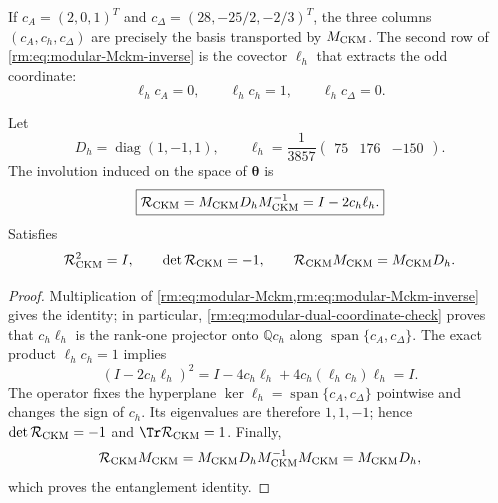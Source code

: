 If \(c_A=(2,0,1)^T\) and
\(c_\Delta=(28,-25/2,-2/3)^T\), the three columns
\((c_A,c_h,c_\Delta)\) are precisely the basis transported by
\(M_{\rm CKM}\). The second row of
\cref{rm:eq:modular-Mckm-inverse} is the covector \(\ell_h\) that extracts the
odd coordinate:
\begin{equation}
\label{rm:eq:modular-dual-coordinate-check}
\ell_hc_A=0,
\qquad
\ell_hc_h=1,
\qquad
\ell_hc_\Delta=0.
\end{equation}

\begin{theorem}
\label{rm:thm:modular-ckm-reflection}
Let
\begin{equation}
\label{rm:eq:modular-Dh-lh}
D_h=\operatorname{diag}(1,-1,1),
\qquad
\ell_h=\frac1{3857}\begin{pmatrix}75&176&-150\end{pmatrix}.
\end{equation}
The involution induced on the space of \(\boldsymbol\theta\) is
\begin{equation}
\label{rm:eq:modular-Rckm}
\boxed{
\mathcal R_{\rm CKM}
=M_{\rm CKM}D_hM_{\rm CKM}^{-1}
=I-2c_h\ell_h.}
\end{equation}
Satisfies
\begin{equation}
\label{rm:eq:modular-Rckm-properties}
\mathcal R_{\rm CKM}^2=I,
\qquad
\det\mathcal R_{\rm CKM}=-1,
\qquad
\mathcal R_{\rm CKM}M_{\rm CKM}=M_{\rm CKM}D_h.
\end{equation}
\end{theorem}

\begin{proof}
Multiplication of
\cref{rm:eq:modular-Mckm,rm:eq:modular-Mckm-inverse} gives the identity; in
particular, \cref{rm:eq:modular-dual-coordinate-check} proves that
\(c_h\ell_h\) is the rank-one projector onto \(\mathbb Qc_h\) along
\(\operatorname{span}\{c_A,c_\Delta\}\). The exact product
\(\ell_hc_h=1\) implies
\[
(I-2c_h\ell_h)^2
=I-4c_h\ell_h+4c_h(\ell_hc_h)\ell_h=I.
\]
The operator fixes the hyperplane
\(\ker\ell_h=\operatorname{span}\{c_A,c_\Delta\}\) pointwise and changes the sign of
\(c_h\). Its eigenvalues are therefore \(1,1,-1\); hence
\(\det\mathcal R_{\rm CKM}=-1\) and
\(\Tr\mathcal R_{\rm CKM}=1\). Finally,
\[
\mathcal R_{\rm CKM}M_{\rm CKM}
=M_{\rm CKM}D_hM_{\rm CKM}^{-1}M_{\rm CKM}
=M_{\rm CKM}D_h,
\]
which proves the entanglement identity.
\end{proof}


